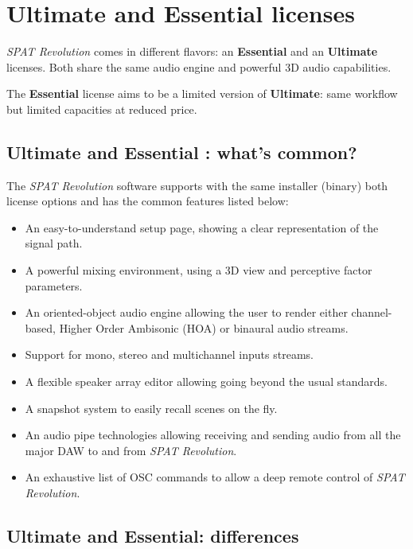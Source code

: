 \documentclass[
  letterpaper,
  DIV=11,
  numbers=noendperiod]{scrreport}
\providecommand{\tightlist}{%
  \setlength{\itemsep}{0pt}\setlength{\parskip}{0pt}}\usepackage{longtable,booktabs,array}
\begin{document}
\hypertarget{ultimate-and-essential-licenses}{%
\chapter{Ultimate and Essential
licenses}\label{ultimate-and-essential-licenses}}

\emph{SPAT Revolution} comes in different flavors: an \textbf{Essential}
and an \textbf{Ultimate} licenses. Both share the same audio engine and
powerful 3D audio capabilities.

The \textbf{Essential} license aims to be a limited version of
\textbf{Ultimate}: same workflow but limited capacities at reduced
price.

\hypertarget{ultimate-and-essential-whats-common}{%
\section{Ultimate and Essential : what's
common?}\label{ultimate-and-essential-whats-common}}

The \emph{SPAT Revolution} software supports with the same installer
(binary) both license options and has the common features listed below:

\begin{itemize}
\tightlist
\item
  An easy-to-understand setup page, showing a clear representation of
  the signal path.
\item
  A powerful mixing environment, using a 3D view and perceptive factor
  parameters.
\item
  An oriented-object audio engine allowing the user to render either
  channel-based, Higher Order Ambisonic (HOA) or binaural audio streams.
\item
  Support for mono, stereo and multichannel inputs streams.
\item
  A flexible speaker array editor allowing going beyond the usual
  standards.
\item
  A snapshot system to easily recall scenes on the fly.
\item
  An audio pipe technologies allowing receiving and sending audio from
  all the major DAW to and from \emph{SPAT Revolution}.
\item
  An exhaustive list of OSC commands to allow a deep remote control of
  \emph{SPAT Revolution}.
\end{itemize}

\hypertarget{ultimate-and-essential-differences}{%
\section{Ultimate and Essential:
differences}\label{ultimate-and-essential-differences}}
\end{document}
